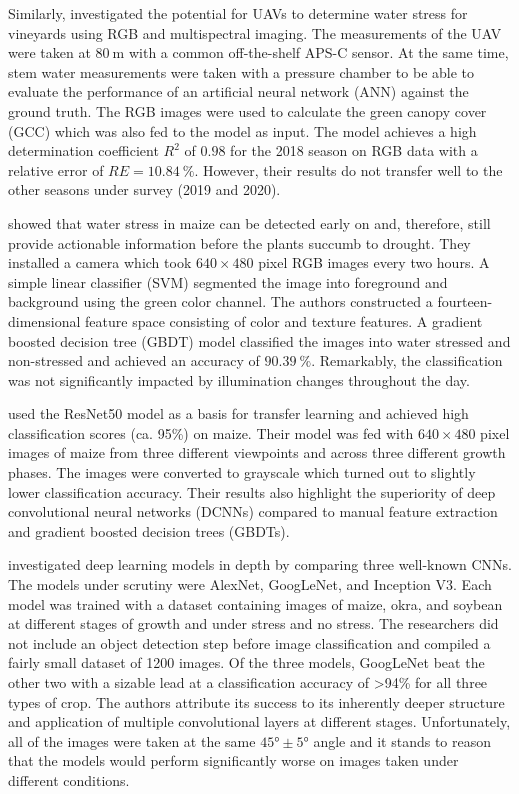 \documentclass[draft,final]{vutinfth} %
\begin{document}
Similarly, \textcite{lopez-garcia2022} investigated the potential for
UAVs to determine water stress for vineyards using RGB and
multispectral imaging. The measurements of the UAV were taken at
$\qty{80}{\meter}$ with a common off-the-shelf APS-C sensor. At the
same time, stem water measurements were taken with a pressure chamber
to be able to evaluate the performance of an artificial neural network
(ANN) against the ground truth. The RGB images were used to calculate
the green canopy cover (GCC) which was also fed to the model as
input. The model achieves a high determination coefficient $R^{2}$ of
$0.98$ for the 2018 season on RGB data with a relative error of
$RE = \qty{10.84}{\percent}$. However, their results do not transfer
well to the other seasons under survey (2019 and 2020).

\textcite{zhuang2017} showed that water stress in maize can be
detected early on and, therefore, still provide actionable information
before the plants succumb to drought. They installed a camera which
took $640\times480$ pixel RGB images every two hours. A simple linear
classifier (SVM) segmented the image into foreground and background
using the green color channel. The authors constructed a
fourteen-dimensional feature space consisting of color and texture
features. A gradient boosted decision tree (GBDT) model classified the
images into water stressed and non-stressed and achieved an accuracy
of $\qty{90.39}{\percent}$. Remarkably, the classification was not
significantly impacted by illumination changes throughout the day.

\textcite{an2019} used the ResNet50 model as a basis for transfer
learning and achieved high classification scores (ca. 95\%) on
maize. Their model was fed with $640\times480$ pixel images of maize
from three different viewpoints and across three different growth
phases. The images were converted to grayscale which turned out to
slightly lower classification accuracy. Their results also highlight
the superiority of deep convolutional neural networks (DCNNs) compared
to manual feature extraction and gradient boosted decision trees
(GBDTs).

\textcite{chandel2021} investigated deep learning models in depth by
comparing three well-known CNNs. The models under scrutiny were
AlexNet, GoogLeNet, and Inception V3. Each model was trained with a
dataset containing images of maize, okra, and soybean at different
stages of growth and under stress and no stress. The researchers did
not include an object detection step before image classification and
compiled a fairly small dataset of 1200 images. Of the three models,
GoogLeNet beat the other two with a sizable lead at a classification
accuracy of >94\% for all three types of crop. The authors attribute
its success to its inherently deeper structure and application of
multiple convolutional layers at different stages. Unfortunately, all
of the images were taken at the same $\ang{45}\pm\ang{5}$ angle and it
stands to reason that the models would perform significantly worse on
images taken under different conditions.
\end{document}
